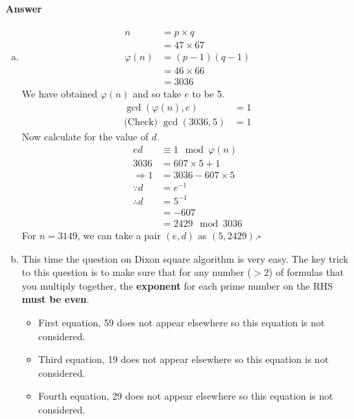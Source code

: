 \documentclass[12pt]{article}
\newcommand{\EOQ}{\hfill $\square$}
\begin{document}
\paragraph{Answer}
\begin{enumerate}[(a)]
\item \begin{equation*}
\begin{split}
n&=p\times q\\
&=47\times 67\\
\varphi(n)&=(p-1)(q-1)\\
&=46\times 66\\
&=3036
\end{split}
\end{equation*}
We have obtained $\varphi(n)$ and so take $e$ to be 5.
\begin{equation*}
\begin{split}
\gcd(\varphi(n),e)&=1\\
\text{(Check) }\gcd(3036,5)&=1
\end{split}
\end{equation*}
Now calculate for the value of $d$.
\begin{equation*}
\begin{split}
ed&\equiv 1\mod \varphi(n)\\
3036&=607\times 5+1\\
\Rightarrow 1&=3036-607\times 5\\
\because d&=e^{-1}\\\therefore d&=5^{-1}\\&=-607\\&=2429\mod 3036
\end{split}
\end{equation*}
For $n=3149$, we can take a pair $(e,d)$ as $(5,2429).$\EOQ
\item This time the question on Dixon square algorithm is very easy. The key trick to this question is to make sure that for any number ($>2$) of formulas that you multiply together, the \textbf{exponent} for each prime number on the RHS \textbf{must be even}. 
\begin{itemize}
\item First equation, 59 does not appear elsewhere so this equation is not considered.
\item Third equation, 19 does not appear elsewhere so this equation is not considered.
\item Fourth equation, 29 does not appear elsewhere so this equation is not considered.
\end{itemize}

\end{enumerate}
\end{document}
